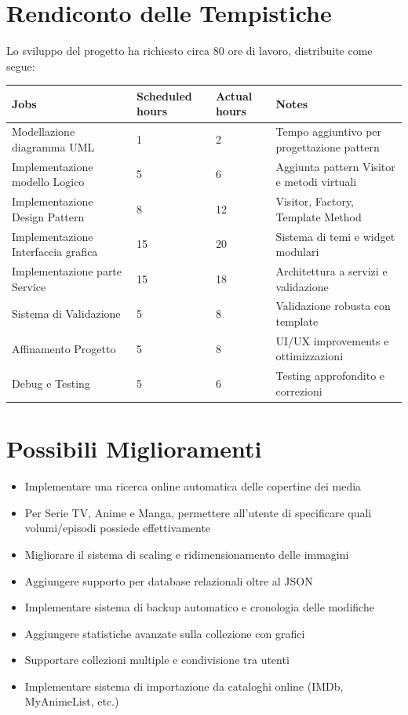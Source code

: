 \documentclass[a4paper,10pt]{article}
\begin{document}
\section{Rendiconto delle Tempistiche}
Lo sviluppo del progetto ha richiesto circa 80 ore di lavoro, distribuite come segue:

\begin{table}[h!]
\centering
\begin{tabularx}{\textwidth}{p{4cm} p{2cm} p{2cm} X}
\hline
\textbf{Jobs} & \textbf{Scheduled hours} & \textbf{Actual hours} & \textbf{Notes} \\
\hline
Modellazione diagramma UML          & 1  & 2  & Tempo aggiuntivo per progettazione pattern \\
Implementazione modello Logico      & 5  & 6  & Aggiunta pattern Visitor e metodi virtuali \\
Implementazione Design Pattern      & 8  & 12 & Visitor, Factory, Template Method \\
Implementazione Interfaccia grafica & 15 & 20 & Sistema di temi e widget modulari \\
Implementazione parte Service       & 15 & 18 & Architettura a servizi e validazione \\
Sistema di Validazione              & 5  & 8  & Validazione robusta con template \\
Affinamento Progetto                & 5  & 8  & UI/UX improvements e ottimizzazioni \\
Debug e Testing                     & 5  & 6  & Testing approfondito e correzioni \\
\hline
\end{tabularx}
\end{table}

\section{Possibili Miglioramenti}
\begin{itemize}
    \item Implementare una ricerca online automatica delle copertine dei media
    \item Per Serie TV, Anime e Manga, permettere all'utente di specificare quali volumi/episodi possiede effettivamente
    \item Migliorare il sistema di scaling e ridimensionamento delle immagini
    \item Aggiungere supporto per database relazionali oltre al JSON
    \item Implementare sistema di backup automatico e cronologia delle modifiche
    \item Aggiungere statistiche avanzate sulla collezione con grafici
    \item Supportare collezioni multiple e condivisione tra utenti
    \item Implementare sistema di importazione da cataloghi online (IMDb, MyAnimeList, etc.)
\end{itemize}
\end{document}

